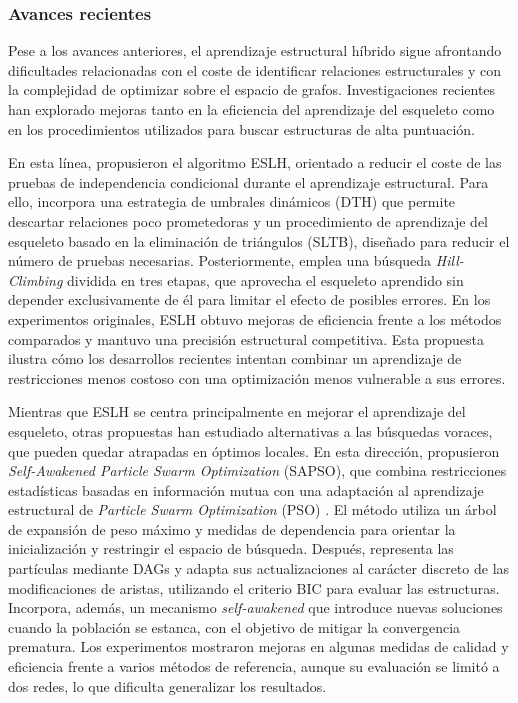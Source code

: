 \subsubsection{Avances recientes}

Pese a los avances anteriores, el aprendizaje estructural híbrido sigue afrontando dificultades relacionadas con el coste de identificar relaciones estructurales y con la complejidad de optimizar sobre el espacio de grafos. Investigaciones recientes han explorado mejoras tanto en la eficiencia del aprendizaje del esqueleto como en los procedimientos utilizados para buscar estructuras de alta puntuación.

En esta línea, \citet{Wang2024ESLH} propusieron el algoritmo ESLH, orientado a reducir el coste de las pruebas de independencia condicional durante el aprendizaje estructural. Para ello, incorpora una estrategia de umbrales dinámicos (DTH) que permite descartar relaciones poco prometedoras y un procedimiento de aprendizaje del esqueleto basado en la eliminación de triángulos (SLTB), diseñado para reducir el número de pruebas necesarias. Posteriormente, emplea una búsqueda \textit{Hill-Climbing} dividida en tres etapas, que aprovecha el esqueleto aprendido sin depender exclusivamente de él para limitar el efecto de posibles errores. En los experimentos originales, ESLH obtuvo mejoras de eficiencia frente a los métodos comparados y mantuvo una precisión estructural competitiva. Esta propuesta ilustra cómo los desarrollos recientes intentan combinar un aprendizaje de restricciones menos costoso con una optimización menos vulnerable a sus errores.

Mientras que ESLH se centra principalmente en mejorar el aprendizaje del esqueleto, otras propuestas han estudiado alternativas a las búsquedas voraces, que pueden quedar atrapadas en óptimos locales. En esta dirección, \citet{Liu2023SAPSO} propusieron \textit{Self-Awakened Particle Swarm Optimization} (SAPSO), que combina restricciones estadísticas basadas en información mutua con una adaptación al aprendizaje estructural de \textit{Particle Swarm Optimization} (PSO) \citep{Kennedy1995PSO}. El método utiliza un árbol de expansión de peso máximo y medidas de dependencia para orientar la inicialización y restringir el espacio de búsqueda. Después, representa las partículas mediante DAGs y adapta sus actualizaciones al carácter discreto de las modificaciones de aristas, utilizando el criterio BIC \citep{Schwarz1978BIC} para evaluar las estructuras. Incorpora, además, un mecanismo \textit{self-awakened} que introduce nuevas soluciones cuando la población se estanca, con el objetivo de mitigar la convergencia prematura. Los experimentos mostraron mejoras en algunas medidas de calidad y eficiencia frente a varios métodos de referencia, aunque su evaluación se limitó a dos redes, lo que dificulta generalizar los resultados.

